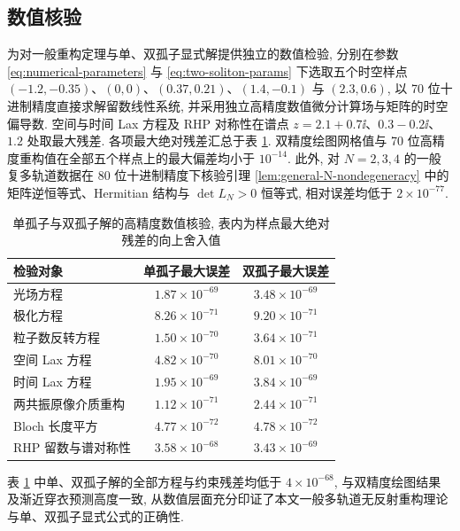 \subsection{数值核验}
为对一般重构定理与单、双孤子显式解提供独立的数值检验, 分别在参数 \eqref{eq:numerical-parameters} 与 \eqref{eq:two-soliton-params} 下选取五个时空样点 $(-1.2,-0.35)$、$(0,0)$、$(0.37,0.21)$、$(1.4,-0.1)$ 与 $(2.3,0.6)$, 以 70 位十进制精度直接求解留数线性系统, 并采用独立高精度数值微分计算场与矩阵的时空偏导数.
空间与时间 Lax 方程及 RHP 对称性在谱点 $z=2.1+0.7\ii$、$0.3-0.2\ii$、$1.2$ 处取最大残差.
各项最大绝对残差汇总于表 \ref{tab:direct-residuals}.
双精度绘图网格值与 70 位高精度重构值在全部五个样点上的最大偏差均小于 $10^{-14}$.
此外, 对 $N=2,3,4$ 的一般复多轨道数据在 80 位十进制精度下核验引理 \ref{lem:general-N-nondegeneracy} 中的矩阵逆恒等式、Hermitian 结构与 $\det L_N>0$ 恒等式, 相对误差均低于 $2\times10^{-77}$.
\begin{table}[htbp]
\centering
\caption{单孤子与双孤子解的高精度数值核验, 表内为样点最大绝对残差的向上舍入值}
\label{tab:direct-residuals}
\begin{tabular}{lcc}
\toprule 检验对象 & 单孤子最大误差 & 双孤子最大误差\\\midrule
光场方程 & $1.87\times10^{-69}$ & $3.48\times10^{-69}$\\
极化方程 & $8.26\times10^{-71}$ & $9.20\times10^{-71}$\\
粒子数反转方程 & $1.50\times10^{-70}$ & $3.64\times10^{-71}$\\
空间 Lax 方程 & $4.82\times10^{-70}$ & $8.01\times10^{-70}$\\
时间 Lax 方程 & $1.95\times10^{-69}$ & $3.84\times10^{-69}$\\
两共振原像介质重构 & $1.12\times10^{-71}$ & $2.44\times10^{-71}$\\
Bloch 长度平方 & $4.77\times10^{-72}$ & $4.78\times10^{-72}$\\
RHP 留数与谱对称性 & $3.58\times10^{-68}$ & $3.43\times10^{-69}$\\
\bottomrule
\end{tabular}
\end{table}

表 \ref{tab:direct-residuals} 中单、双孤子解的全部方程与约束残差均低于 $4\times10^{-68}$, 与双精度绘图结果及渐近穿衣预测高度一致, 从数值层面充分印证了本文一般多轨道无反射重构理论与单、双孤子显式公式的正确性.
